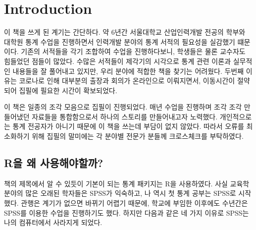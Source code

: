 \documentclass[
]{book}
\theoremstyle{definition}
\theoremstyle{definition}
\theoremstyle{definition}
\theoremstyle{definition}
\theoremstyle{remark}
\begin{document}
\mainmatter

\hypertarget{intro}{%
\chapter{Introduction}\label{intro}}

이 책을 쓰게 된 계기는 간단하다. 약 6년간 서울대학교 산업인력개발 전공의 학부와 대학원 통계 수업을 진행하면서 인력개발 분야의 통계 서적의 필요성을 실감했기 떄문이다. 기존의 서적들을 각기 조합하여 수업을 진행하다보니, 학생들은 물론 교수자도 힘들었던 점들이 많았다. 수많은 서적들이 제각기의 시각으로 통계 관련 이론과 실무적인 내용들을 잘 풀어내고 있지만, 우리 분야에 적합한 책을 찾기는 어려웠다. 두번째 이유는 코로나로 인해 대부분의 출장과 회의가 온라인으로 이뤄지면서, 이동시간이 절약되어 집필에 필요한 시간이 확보되었다.

이 책은 일종의 조각 모음으로 집필이 진행되었다. 매년 수업을 진행하며 조각 조각 만들어냈던 자료들을 통합함으로서 하나의 스토리를 만들어내고자 노력했다. 개인적으로는 통계 전공자가 아니기 때문에 이 책을 쓰는데 부담이 없지 않았다. 따라서 오류를 최소화하기 위해 집필의 말미에는 각 분야별 전문가 분들께 크로스체크를 부탁하였다.

\hypertarget{ruxc744-uxc65c-uxc0acuxc6a9uxd574uxc57cuxd560uxae4c}{%
\section{R을 왜 사용해야할까?}\label{ruxc744-uxc65c-uxc0acuxc6a9uxd574uxc57cuxd560uxae4c}}

책의 제목에서 알 수 있듯이 기본이 되는 통계 패키지는 R을 사용하였다. 사실 교육학 분야의 많은 오래된 학자들은 SPSS가 익숙하고, 나 역시 첫 통계 공부는 SPSS로 시작했다. 관행은 계기가 없으면 바뀌기 어렵기 때문에, 학교에 부임한 이후에도 수년간은 SPSS를 이용한 수업을 진행하기도 했다. 하지만 다음과 같은 네 가지 이유로 SPSS는 나의 컴퓨터에서 사라지게 되었다.
\end{document}
